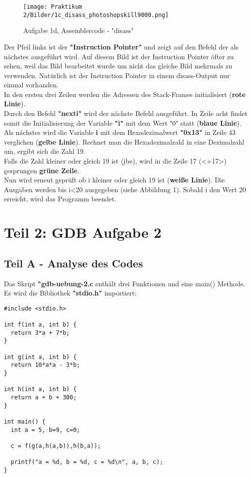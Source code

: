 \documentclass[12pt]{article}
\begin{document}
\begin{figure}[htbp]
    \centering
    \texttt{[image: Praktikum 2/Bilder/1c\_disass\_photoshopskill9000.png]}
    \caption{Aufgabe 1d, Assemblercode - "disass"}
\end{figure}

Der Pfeil links ist der \textbf{"Instruction Pointer"} und zeigt auf den Befehl der als nächstes ausgeführt wird. Auf diesem Bild ist der Instruction Pointer öfter zu sehen, weil das Bild bearbeitet wurde um nicht das gleiche Bild mehrmals zu verwenden. Natürlich ist der Instruction Pointer in einem disass-Output nur einmal vorhanden.\\

In den ersten drei Zeilen werden die Adressen des Stack-Frames initialisiert (\textbf{rote Linie}). \\

Durch den Befehl \textbf{"nexti"} wird der nächste Befehl ausgeführt. In Zeile acht findet somit die Initialisierung der Variable \textbf{"i"} mit dem Wert "0" statt (\textbf{blaue Linie}).\\


Als nächstes wird die Variable \textbf{i} mit dem Hexadezimalwert \textbf{"0x13"} in Zeile 43 verglichen (\textbf{gelbe Linie}).
Rechnet man die Hexadezimalzahl in eine Dezimalzahl um, ergibt sich die Zahl 19.\\

Falls die Zahl kleiner oder gleich 19 ist (jbe), wird in die Zeile 17 (<+17>) gesprungen \textbf{grüne Zeile}.\\

Nun wird erneut geprüft ob i kleiner oder gleich 19 ist (\textbf{weiße Linie}). Die Ausgaben werden bis i<20 ausgegeben (siehe Abbildung 1). Sobald i den Wert 20 erreicht, wird das Programm beendet.\\
\newpage

\section{Teil 2: GDB Aufgabe 2}
\subsection{Teil A - Analyse des Codes}

Das Skript \textbf{"gdb-uebung-2.c} enthält drei Funktionen und eine main() Methode. Es wird die Bibliothek \textbf{"stdio.h"} importiert:

\begin{lstlisting}
#include <stdio.h>

int f(int a, int b) {
  return 3*a + 7*b;
}

int g(int a, int b) {
  return 10*a*a - 3*b;
}

int h(int a, int b) {
  return a + b + 300;
}

int main() {
  int a = 5, b=9, c=0;

  c = f(g(a,h(a,b)),h(b,a));

  printf("a = %d, b = %d, c = %d\n", a, b, c);
}
\end{lstlisting}
\end{document}
